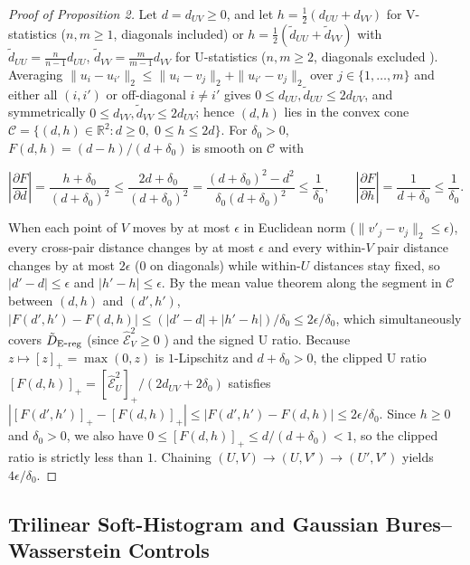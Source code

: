\begin{proof}[Proof of Proposition 2]

Let $d=d_{UV}\ge 0$, and let $h=\tfrac12(d_{UU}+d_{VV})$ for V-statistics ($n,m\ge 1$, diagonals included) or $h=\tfrac12(\tilde d_{UU}+\tilde d_{VV})$ with $\tilde d_{UU}=\frac{n}{n-1}d_{UU}$, $\tilde d_{VV}=\frac{m}{m-1}d_{VV}$ for U-statistics ($n,m\ge 2$, diagonals excluded \cite{ref28}). Averaging $\|u_i-u_{i'}\|_2\le\|u_i-v_j\|_2+\|u_{i'}-v_j\|_2$ over $j\in\{1,\ldots,m\}$ and either all $(i,i')$ or off-diagonal $i\ne i'$ gives $0\le d_{UU},\tilde d_{UU}\le 2d_{UV}$, and symmetrically $0\le d_{VV},\tilde d_{VV}\le 2d_{UV}$; hence $(d,h)$ lies in the convex cone $\mathcal C=\{(d,h)\in\mathbb R^2:d\ge 0,\;0\le h\le 2d\}$. For $\delta_0>0$, $F(d,h)=(d-h)/(d+\delta_0)$ is smooth on $\mathcal C$ with


\[
\left|\frac{\partial F}{\partial d}\right|=\frac{h+\delta_0}{(d+\delta_0)^2}\le\frac{2d+\delta_0}{(d+\delta_0)^2}=\frac{(d+\delta_0)^2-d^2}{\delta_0(d+\delta_0)^2}\le\frac{1}{\delta_0},\qquad\left|\frac{\partial F}{\partial h}\right|=\frac{1}{d+\delta_0}\le\frac{1}{\delta_0}.
\]

When each point of $V$ moves by at most $\epsilon$ in Euclidean norm ($\|v'_j-v_j\|_2\le\epsilon$), every cross-pair distance changes by at most $\epsilon$ and every within-$V$ pair distance changes by at most $2\epsilon$ ($0$ on diagonals) while within-$U$ distances stay fixed, so $|d'-d|\le\epsilon$ and $|h'-h|\le\epsilon$. By the mean value theorem along the segment in $\mathcal C$ between $(d,h)$ and $(d',h')$, $|F(d',h')-F(d,h)|\le(|d'-d|+|h'-h|)/\delta_0\le 2\epsilon/\delta_0$, which simultaneously covers $\tilde D_{\mathrm{E\mbox{-}reg}}{}$ (since $\widehat{\mathcal E}_V^2\ge 0$ \cite{ref27}) and the signed U ratio. Because $z\mapsto[z]_+=\max(0,z)$ is $1$-Lipschitz and $d+\delta_0>0$, the clipped U ratio $[F(d,h)]_+=[\widehat{\mathcal E}_U^2]_+/(2d_{UV}+2\delta_0)$ satisfies $|[F(d',h')]_+-[F(d,h)]_+|\le|F(d',h')-F(d,h)|\le 2\epsilon/\delta_0$. Since $h\ge 0$ and $\delta_0>0$, we also have $0\le[F(d,h)]_+\le d/(d+\delta_0)<1$, so the clipped ratio is strictly less than $1$. Chaining $(U,V)\to(U,V')\to(U',V')$ yields $4\epsilon/\delta_0$.\end{proof}

\subsection*{Trilinear Soft-Histogram and Gaussian Bures--Wasserstein Controls}

